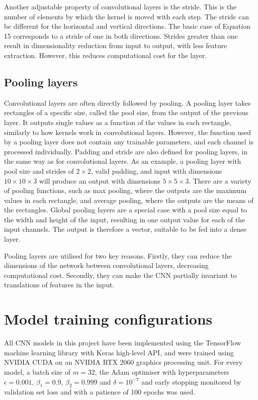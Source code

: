 \documentclass[12pt]{article}
\begin{document}
Another adjustable property of convolutional layers is the stride. This is the number of elements by which the kernel is moved with each step. The stride can be different for the horizontal and vertical directions. The basic case of Equation 15 corresponds to a stride of one in both directions. Strides greater than one result in dimensionality reduction from input to output, with less feature extraction. However, this reduces computational cost for the layer.

\subsection{Pooling layers}
Convolutional layers are often directly followed by pooling. A pooling layer takes rectangles of a specific size, called the pool size, from the output of the previous layer. It outputs single values as a function of the values in each rectangle, similarly to how kernels work in convolutional layers. However, the function used by a pooling layer does not contain any trainable parameters, and each channel is processed individually. Padding and stride are also defined for pooling layers, in the same way as for convolutional layers. As an example, a pooling layer with pool size and strides of $2 \times 2$, valid padding, and input with dimensions $10 \times 10 \times 3$ will produce an output with dimensions $5 \times 5 \times 3$. There are a variety of pooling functions, such as max pooling, where the outputs are the maximum values in each rectangle, and average pooling, where the outputs are the means of the rectangles. Global pooling layers are a special case with a pool size equal to the width and height of the input, resulting in one output value for each of the input channels. The output is therefore a vector, suitable to be fed into a dense layer.

Pooling layers are utilised for two key reasons. Firstly, they can reduce the dimensions of the network between convolutional layers, decreasing computational cost. Secondly, they can make the CNN partially invariant to translations of features in the input.
\section{Model training configurations}
All CNN models in this project have been implemented using the TensorFlow machine learning library with Keras high-level API, and were trained using NVIDIA CUDA on an NVIDIA RTX 2060 graphics processing unit. For every model, a batch size of $m=32$, the Adam optimiser with hyperparameters $\epsilon=0.001$, $\beta_1=0.9$, $\beta_2=0.999$ and $\delta=10^{-7}$ and early stopping  monitored by validation set loss and with a patience of 100 epochs was used.
\end{document}
